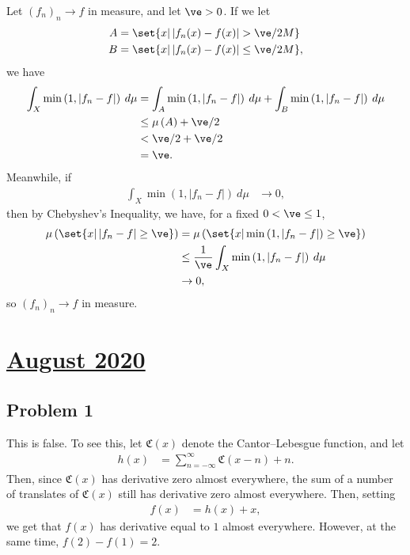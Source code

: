 \documentclass[10pt]{mypackage}
\begin{document}
Let $\left( f_n \right)_n\rightarrow f$ in measure, and let $\ve > 0$. If we let
\begin{align*}
  A &= \set{x | \left\vert f_n(x)-f(x) \right\vert > \ve/2M}\\
  B &= \set{x | \left\vert f_n(x)-f(x) \right\vert \leq \ve/2M},
\end{align*}
we have
\begin{align*}
  \int_{X}^{} \min\left( 1,\left\vert f_n-f \right\vert \right)\:d\mu &= \int_{A}^{} \min\left( 1,\left\vert f_n-f \right\vert \right) \:d\mu + \int_{B}^{} \min\left( 1,\left\vert f_n-f \right\vert \right) \:d\mu\\
                                                                      &\leq \mu\left( A \right) + \ve/2\\
                                                                      &< \ve/2 + \ve/2\\
                                                                      &= \ve.
\end{align*}
Meanwhile, if
\begin{align*}
  \int_{X}^{} \min\left( 1,\left\vert f_n-f \right\vert \right)\:d\mu &\rightarrow 0,
\end{align*}
then by Chebyshev's Inequality, we have, for a fixed $0 < \ve \leq 1$,
\begin{align*}
  \mu\left( \set{x | \left\vert f_n-f \right\vert \geq \ve} \right) &= \mu \left( \set{x | \min\left( 1,\left\vert f_n-f \right\vert \right) \geq \ve} \right)\\
                                                                    &\leq \frac{1}{\ve} \int_{X}^{} \min\left( 1,\left\vert f_n-f \right\vert \right)\:d\mu\\
                                                                    &\rightarrow 0,
\end{align*}
so $\left( f_n \right)_n\rightarrow f$ in measure.
\section{\href{https://math.virginia.edu/graduate/exams/analysis/2020Aug_real.pdf}{August 2020}}%
\subsection{Problem 1}%
This is false. To see this, let $ \mathfrak{C}(x) $ denote the Cantor--Lebesgue function, and let
\begin{align*}
  h(x) &= \sum_{n=-\infty}^{\infty} \mathfrak{C}\left( x - n \right) + n.
\end{align*}
Then, since $\mathfrak{C}(x)$ has derivative zero almost everywhere, the sum of a number of translates of $\mathfrak{C}(x)$ still has derivative zero almost everywhere. Then, setting
\begin{align*}
  f(x) &= h(x) + x,
\end{align*}
we get that $f(x)$ has derivative equal to $1$ almost everywhere. However, at the same time, $f(2) - f(1) = 2$.
\end{document}
